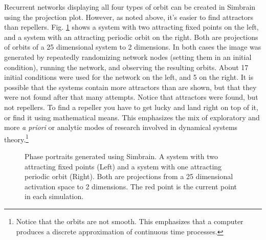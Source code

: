 Recurrent networks displaying all four types of orbit can  be created in Simbrain using the projection plot. However, as noted above, it's easier to find attractors than repellers. Fig. \ref{F:simbrainStateSpace} shows a system with two attracting fixed points on the left, and a system with an attracting periodic orbit on the right. Both are projections of orbits of a 25 dimensional system to 2 dimensions. In both cases the image was generated by repeatedly randomizing network nodes (setting them in an initial condition), running the network, and observing the resulting orbits. About 17 initial conditions were used for the network on the left, and 5 on the right. It is possible that the systems contain more attractors than are shown, but that they were not found after that many attempts. Notice that attractors were found, but not repellers. To find a repeller you have to get lucky and land right on top of it, or find it using mathematical means. This emphasizes the mix of exploratory and more \emph{a priori} or analytic modes of research involved in dynamical systems theory.\footnote{Notice that the orbits are not smooth. This emphasizes that a computer produces a discrete approximation of continuous time processes.} 

\begin{figure}[h]
\centering
{}
\hspace*{.5 in}
\caption[Simbrain screenshots.]{Phase portraits generated using Simbrain. A system with two attracting fixed points (Left) and a system with one attracting periodic orbit (Right). Both are projections from a 25 dimensional activation space to 2 dimensions. The red point is the current point in each simulation. }
\label{F:simbrainStateSpace}
\end{figure}
